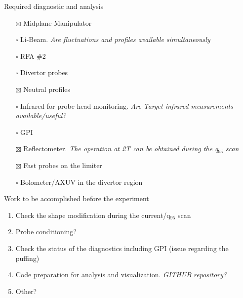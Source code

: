 \documentclass[10pt, compress]{beamer}
\begin{document}
\begin{frame}{Required diagnostic and analysis}
  \begin{itemize}
    \item[$\boxtimes$] Midplane Manipulator
    \item[$\square$] Li-Beam. \emph{Are fluctuations and profiles
        available simultaneously}
    \item[$\square$] RFA \#2
    \item[$\square$] Divertor probes
    \item[$\boxtimes$] Neutral profiles
    \item[$\square$] Infrared for probe head monitoring. \emph{Are Target
      infrared measurements available/useful?}
    \item[$\square$] GPI
    \item[$\boxtimes$] Reflectometer. \emph{The operation at 2T can be
      obtained during the q$_{95}$ scan}
    \item[$\boxtimes$] Fast probes on the limiter
    \item[$\square$] Bolometer/AXUV in the divertor region
  \end{itemize}
\end{frame}

\begin{frame}{Work to be accomplished before the experiment}
  \begin{enumerate}
    \item Check the shape modification during the current/q$_{95}$
      scan
    \item Probe conditioning?
    \item Check the status of the diagnostics including GPI (issue
      regarding the puffing)
    \item Code preparation for analysis and
      visualization. \emph{GITHUB repository?}
    \item Other?
  \end{enumerate}
\end{frame}
\end{document}
